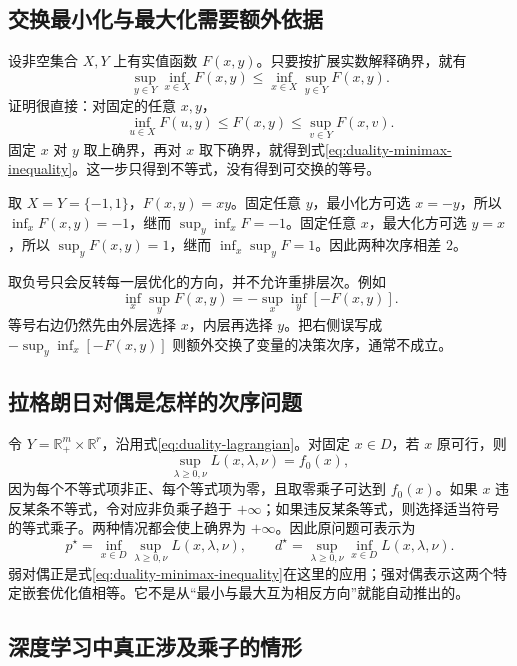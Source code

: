 \documentclass[UTF8,12pt,a4paper,fontset=fandol]{ctexart}
\begin{document}
\subsection{交换最小化与最大化需要额外依据}

设非空集合 $X,Y$ 上有实值函数 $F(x,y)$。只要按扩展实数解释确界，就有
\begin{equation}
 \sup_{y\in Y}\inf_{x\in X}F(x,y)
 \leq
 \inf_{x\in X}\sup_{y\in Y}F(x,y).
 \label{eq:duality-minimax-inequality}
\end{equation}
证明很直接：对固定的任意 $x,y$，
\[
 \inf_{u\in X}F(u,y)\leq F(x,y)\leq\sup_{v\in Y}F(x,v).
\]
固定 $x$ 对 $y$ 取上确界，再对 $x$ 取下确界，就得到式\eqref{eq:duality-minimax-inequality}。这一步只得到不等式，没有得到可交换的等号。

\begin{example}
取 $X=Y=\{-1,1\}$，$F(x,y)=xy$。固定任意 $y$，最小化方可选 $x=-y$，所以 $\inf_xF(x,y)=-1$，继而 $\sup_y\inf_xF=-1$。固定任意 $x$，最大化方可选 $y=x$，所以 $\sup_yF(x,y)=1$，继而 $\inf_x\sup_yF=1$。因此两种次序相差 $2$。
\end{example}

取负号只会反转每一层优化的方向，并不允许重排层次。例如
\[
 \inf_x\sup_y F(x,y)
 =-\sup_x\inf_y[-F(x,y)].
\]
等号右边仍然先由外层选择 $x$，内层再选择 $y$。把右侧误写成 $-\sup_y\inf_x[-F(x,y)]$ 则额外交换了变量的决策次序，通常不成立。

\subsection{拉格朗日对偶是怎样的次序问题}

令 $Y=\mathbb R_+^m\times\mathbb R^r$，沿用式\eqref{eq:duality-lagrangian}。对固定 $x\in D$，若 $x$ 原可行，则
\[
 \sup_{\lambda\geq0,\nu}L(x,\lambda,\nu)=f_0(x),
\]
因为每个不等式项非正、每个等式项为零，且取零乘子可达到 $f_0(x)$。如果 $x$ 违反某条不等式，令对应非负乘子趋于 $+\infty$；如果违反某条等式，则选择适当符号的等式乘子。两种情况都会使上确界为 $+\infty$。因此原问题可表示为
\begin{equation}
 p^\star=\inf_{x\in D}\sup_{\lambda\geq0,\nu}L(x,\lambda,\nu),
 \qquad
 d^\star=\sup_{\lambda\geq0,\nu}\inf_{x\in D}L(x,\lambda,\nu).
 \label{eq:duality-nested}
\end{equation}
弱对偶正是式\eqref{eq:duality-minimax-inequality}在这里的应用；强对偶表示这两个特定嵌套优化值相等。它不是从“最小与最大互为相反方向”就能自动推出的。

\subsection{深度学习中真正涉及乘子的情形}
\end{document}
